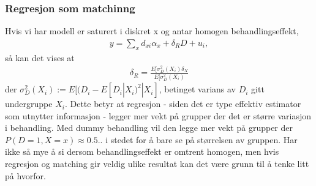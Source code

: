 \subsubsection{Regresjon som matchinng}
Hvis vi har modell er saturert i diskret x og antar homogen behandlingseffekt,
\begin{align}
y= \sum_x d_{xi}\alpha_x+\delta_R D + u_i,
\end{align}
så kan det vises at 
\begin{align}
\delta_R = \frac{E[\sigma_D^2(X_i)\delta_X}{E[\sigma_D^2(X_i)}
\end{align}
der $\sigma_D^2(X_i) := E[(D_i-E[D_i|X_i)^2|X_i]$, betinget varians av $D_i$ gitt undergruppe $X_i$. Dette betyr at regresjon - siden det er type effektiv estimator som utnytter informasjon - legger mer vekt på grupper der det er større variasjon i behandling. Med dummy behandling vil den legge mer vekt på grupper der $P(D=1,X=x) \approx 0.5$.. i stedet for å bare se på størrelsen av gruppen. Har ikke så mye å si dersom behandlingseffekt er omtrent homogen, men hvis regresjon og matching gir veldig ulike resultat kan det være grunn til å tenke litt på hvorfor. 
